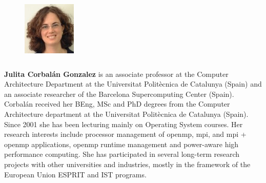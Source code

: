 \documentclass{article}
\begin{document}
  \begin{figure} 
    \includegraphics[width=1in,height=1.25in,clip,keepaspectratio]{pictures/julita.jpeg}
  \end{figure}\par

  \textbf{Julita Corbal\'an Gonzalez} is an associate professor at the Computer Architecture Department at the Universitat Polit\`ecnica de Catalunya (Spain) and an associate researcher of the Barcelona Supercomputing Center (Spain). Corbal\'an received her BEng, MSc and PhD degrees from the Computer Architecture department at the Universitat Polit\`ecnica de Catalunya (Spain). Since 2001 she has been lecturing mainly on Operating System courses. Her research interests include processor management of openmp, mpi, and mpi + openmp applications, openmp runtime management and power-aware high performance computing. She has participated in several long-term research projects with other universities and industries, mostly in the framework of the European Union ESPRIT and IST programs. \par
\end{document}
